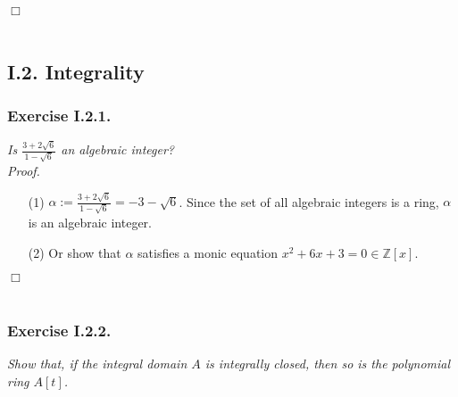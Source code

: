 \documentclass{article}
\begin{document}
$\Box$ \\\\






\subsection*{I.2. Integrality \\}



\subsubsection*{Exercise I.2.1.}
\emph{Is $\frac{3+2\sqrt{6}}{1-\sqrt{6}}$ an algebraic integer?} \\



\emph{Proof.}
\begin{enumerate}
\item[(1)]
  $\alpha := \frac{3+2\sqrt{6}}{1-\sqrt{6}} = -3-\sqrt{6}$.
  Since the set of all algebraic integers is a ring,
  $\alpha$ is an algebraic integer.

\item[(2)]
  Or show that $\alpha$ satisfies a monic equation $x^2 + 6x + 3 = 0 \in \mathbb{Z}[x]$.
\end{enumerate}
$\Box$ \\\\






\subsubsection*{Exercise I.2.2.}
\emph{Show that, if the integral domain $A$ is integrally closed,
then so is the polynomial ring $A[t]$.} \\
\end{document}
